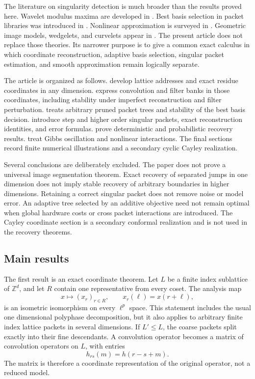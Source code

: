 \documentclass[11pt,a4paper]{article}
\theoremstyle{definition}
\theoremstyle{remark}
\newcommand{\ZZ}{\mathbb Z}
\begin{document}
The literature on singularity detection is much broader than the results proved here. Wavelet modulus maxima are developed in \cite{MallatHwang1992}. Best basis selection in packet libraries was introduced in \cite{CoifmanWickerhauser1992}. Nonlinear approximation is surveyed in \cite{DeVore1998}. Geometric image models, wedgelets, and curvelets appear in \cite{Donoho1999,CandesDonoho2004}. The present article does not replace those theories. Its narrower purpose is to give a common exact calculus in which coordinate reconstruction, adaptive basis selection, singular packet estimation, and smooth approximation remain logically separate.

The article is organized as follows.  develop lattice addresses and exact residue coordinates in any dimension.  express convolution and filter banks in those coordinates, including stability under imperfect reconstruction and filter perturbation.  treats arbitrary pruned packet trees and stability of the best basis decision.  introduce step and higher order singular packets, exact reconstruction identities, and error formulas.  prove deterministic and probabilistic recovery results.  treat Gibbs oscillation and nonlinear interactions. The final sections record finite numerical illustrations and a secondary cyclic Cayley realization.

Several conclusions are deliberately excluded. The paper does not prove a universal image segmentation theorem. Exact recovery of separated jumps in one dimension does not imply stable recovery of arbitrary boundaries in higher dimensions. Retaining a correct singular packet does not remove noise or model error. An adaptive tree selected by an additive objective need not remain optimal when global hardware costs or cross packet interactions are introduced. The Cayley coordinate section is a secondary conformal realization and is not used in the recovery theorems.

\subsection{Main results}

The first result is an exact coordinate theorem. Let \(L\) be a finite index sublattice of \(\ZZ^d\), and let \(R\) contain one representative from every coset. The analysis map
\[
x\longmapsto (x_r)_{r\in R},
\qquad
x_r(\ell)=x(r+\ell),
\]
is an isometric isomorphism on every \(\ell^p\) space. This statement includes the usual one dimensional polyphase decomposition, but it also applies to arbitrary finite index lattice packets in several dimensions. If \(L'\leq L\), the coarse packets split exactly into their fine descendants. A convolution operator becomes a matrix of convolution operators on \(L\), with entries
\[
h_{rs}(m)=h(r-s+m).
\]
The matrix is therefore a coordinate representation of the original operator, not a reduced model.
\end{document}
